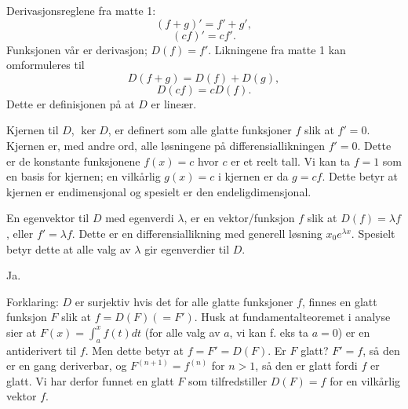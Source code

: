 \begin{losning}

\begin{punkt}
Derivasjonsreglene fra matte 1: 
$$(f+g)'=f'+g',$$ $$(cf)'=cf'.$$ Funksjonen vår er derivasjon; $D(f)=f'$. Likningene fra matte 1 kan omformuleres til $$D(f+g)=D(f)+D(g),$$ $$D(cf)=cD(f).$$ Dette er definisjonen på at $D$ er lineær.
\end{punkt}

\begin{punkt}
Kjernen til $D$, $\ker D$, er definert som alle glatte funksjoner $f$ slik at $f'=0$. Kjernen er, med andre ord, alle løsningene på differensiallikningen $f'=0$. Dette er de konstante funksjonene $f(x)=c$ hvor $c$ er et reelt tall. Vi kan ta $f=1$ som en basis for kjernen; en vilkårlig $g(x)=c$ i kjernen er da $g=cf$. Dette betyr at kjernen er endimensjonal og spesielt er den endeligdimensjonal.
\end{punkt}

\begin{punkt}
En egenvektor til $D$ med egenverdi $\lambda$, er en vektor/funksjon $f$ slik at $D(f)=\lambda f$, eller $f'=\lambda f$. Dette er en differensiallikning med generell løsning $x_0e^{\lambda x}$. Spesielt betyr dette at alle valg av $\lambda$ gir egenverdier til $D$.
\end{punkt}

\begin{punkt}
Ja.

\noindent
Forklaring: $D$ er surjektiv hvis det for alle glatte funksjoner $f$, finnes en glatt funksjon $F$ slik at $f=D(F)(=F')$. Husk at fundamentalteoremet i analyse sier at $F(x)=\int_a^x f(t)dt$ (for alle valg av $a$, vi kan f. eks ta $a=0$) er en antiderivert til $f$. Men dette betyr at $f=F'=D(F)$. Er $F$ glatt? $F'=f$, så den er en gang deriverbar, og $F^{(n+1)}=f^{(n)}$ for $n>1$, så den er glatt fordi $f$ er glatt. Vi har derfor funnet en glatt $F$ som tilfredstiller $D(F)=f$ for en vilkårlig vektor $f$.
\end{punkt}

\end{losning}



